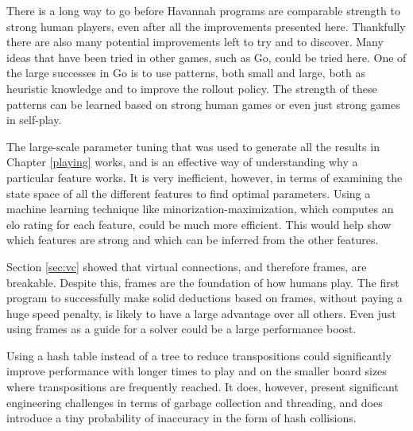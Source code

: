 There is a long way to go before Havannah programs are comparable strength to strong human players, even after all the improvements presented here. Thankfully there are also many potential improvements left to try and to discover. Many ideas that have been tried in other games, such as Go, could be tried here. One of the large successes in Go is to use patterns, both small and large, both as heuristic knowledge and to improve the rollout policy. The strength of these patterns can be learned based on strong human games or even just strong games in self-play.

The large-scale parameter tuning that was used to generate all the results in Chapter \ref{playing} works, and is an effective way of understanding why a particular feature works. It is very inefficient, however, in terms of examining the state space of all the different features to find optimal parameters. Using a machine learning technique like minorization-maximization\cite{coulom2007computing}, which computes an elo rating for each feature, could be much more efficient. This would help show which features are strong and which can be inferred from the other features.

Section \ref{sec:vc} showed that virtual connections, and therefore frames, are breakable. Despite this, frames are the foundation of how humans play. The first program to successfully make solid deductions based on frames, without paying a huge speed penalty, is likely to have a large advantage over all others. Even just using frames as a guide for a solver could be a large performance boost.

Using a hash table instead of a tree to reduce transpositions could significantly improve performance with longer times to play and on the smaller board sizes where transpositions are frequently reached. It does, however, present significant engineering challenges in terms of garbage collection and threading, and does introduce a tiny probability of inaccuracy in the form of hash collisions.








